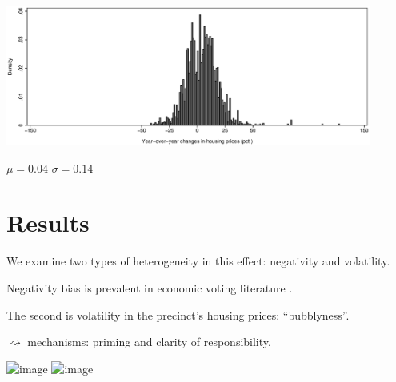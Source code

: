 \documentclass[aspectratio=169]{beamer}
\begin{document}
\begin{frame}
\begin{center}
\includegraphics[width=0.9\textwidth]{../../figures/hphist.eps}	

$\mu=0.04$ \hspace{0.1in} $\sigma=0.14$
\end{center}
\end{frame}	


\section{Results}
\begin{frame}
	\footnotesize
\end{frame}		

\begin{frame}
We examine two types of heterogeneity in this effect: negativity and volatility.

\vspace{0.3in} \pause

Negativity bias is prevalent in economic voting literature \citep[e.g.][]{bloom1975voter}.

\vspace{0.3in} \pause

The second is volatility in the precinct's housing prices: ``bubblyness''.


$\rightsquigarrow$ mechanisms: priming and clarity of responsibility.

\end{frame}	
\begin{frame}
\begin{center}
	\includegraphics<1>[width=0.6\textwidth]{../../figures/posnegplot}
	\includegraphics<2>[width=0.6\textwidth]{../../figures/volaplot}
\end{center}

\end{frame}	
\end{document}
